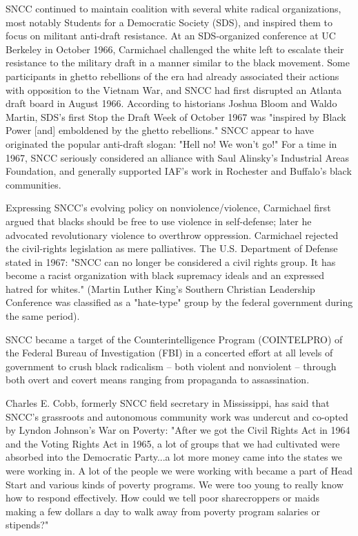 SNCC continued to maintain coalition with several white radical
organizations, most notably Students for a Democratic Society (SDS), and
inspired them to focus on militant anti-draft resistance. At an
SDS-organized conference at UC Berkeley in October 1966, Carmichael
challenged the white left to escalate their resistance to the military
draft in a manner similar to the black movement. Some participants in
ghetto rebellions of the era had already associated their actions with
opposition to the Vietnam War, and SNCC had first disrupted an Atlanta
draft board in August 1966. According to historians Joshua Bloom and
Waldo Martin, SDS's first Stop the Draft Week of October 1967 was
"inspired by Black Power {[}and{]} emboldened by the ghetto rebellions."
SNCC appear to have originated the popular anti-draft slogan: "Hell no!
We won't go!" For a time in 1967, SNCC seriously considered an alliance
with Saul Alinsky's Industrial Areas Foundation, and generally supported
IAF's work in Rochester and Buffalo's black communities.

Expressing SNCC's evolving policy on nonviolence/violence, Carmichael
first argued that blacks should be free to use violence in self-defense;
later he advocated revolutionary violence to overthrow oppression.
Carmichael rejected the civil-rights legislation as mere palliatives.
The U.S. Department of Defense stated in 1967: "SNCC can no longer be
considered a civil rights group. It has become a racist organization
with black supremacy ideals and an expressed hatred for whites." (Martin
Luther King's Southern Christian Leadership Conference was classified as
a "hate-type" group by the federal government during the same period).

SNCC became a target of the Counterintelligence Program (COINTELPRO) of
the Federal Bureau of Investigation (FBI) in a concerted effort at all
levels of government to crush black radicalism -- both violent and
nonviolent -- through both overt and covert means ranging from
propaganda to assassination.

Charles E. Cobb, formerly SNCC field secretary in Mississippi, has said
that SNCC's grassroots and autonomous community work was undercut and
co-opted by Lyndon Johnson's War on Poverty: "After we got the Civil
Rights Act in 1964 and the Voting Rights Act in 1965, a lot of groups
that we had cultivated were absorbed into the Democratic Party...a lot
more money came into the states we were working in. A lot of the people
we were working with became a part of Head Start and various kinds of
poverty programs. We were too young to really know how to respond
effectively. How could we tell poor sharecroppers or maids making a few
dollars a day to walk away from poverty program salaries or stipends?"

